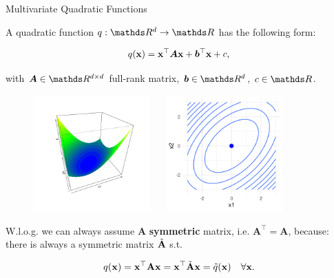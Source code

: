 \documentclass[11pt,compress,t,notes=noshow, xcolor=table]{beamer}
\begin{document}
  \begin{vbframe}{Multivariate Quadratic Functions}
  
  A quadratic function $q: \R^d \to \R$ has the following form: 
  
  $$
    q(\mathbf{x}) = \mathbf{x}^\top \bm{A} \mathbf{x} + \bm{b}^\top \mathbf{x} + c,
  $$
  
  with $\bm{A} \in \R^{d \times d}$ full-rank matrix, $\bm{b} \in \R^d$, $c \in \R$. %
  
  \begin{figure}
    \includegraphics[height=0.4\textwidth, width = 0.4\textwidth]{figure_man/quadratic_functions_2D_example_1_1.png} ~~ \includegraphics[height=0.4\textwidth, width = 0.4\textwidth]{figure_man/quadratic_functions_2D_example_1_2.png}\\
    \begin{footnotesize} 
    \end{footnotesize}
  \end{figure}
  
  \framebreak 
  
  
  W.l.o.g. we can always assume $\bm{A}$ \textbf{symmetric} matrix, i.e. $\bm{A}^\top = \bm{A}$, because: there is always a symmetric matrix $\tilde {\mathbf{A}}$ s.t. 
  
  \vspace*{-0.3cm}
  
  \begin{eqnarray*}
    q(\mathbf{x}) = \mathbf{x}^\top \mathbf{A} \mathbf{x} = \mathbf{x}^\top \tilde {\mathbf{A}} \mathbf{x} = \tilde q(\mathbf{x}) \quad \forall \mathbf{x}.
  \end{eqnarray*}
  

\end{vbframe}
\end{document}
